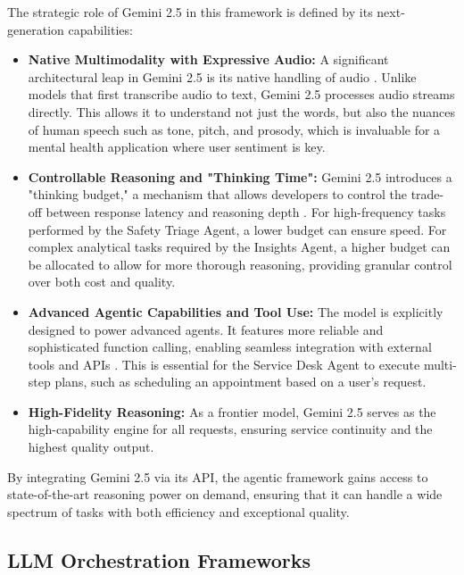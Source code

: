 The strategic role of Gemini 2.5 in this framework is defined by its next-generation capabilities:
\begin{itemize}
    \item \textbf{Native Multimodality with Expressive Audio:} A significant architectural leap in Gemini 2.5 is its native handling of audio \cite{googleblogaudio2025}. Unlike models that first transcribe audio to text, Gemini 2.5 processes audio streams directly. This allows it to understand not just the words, but also the nuances of human speech such as tone, pitch, and prosody, which is invaluable for a mental health application where user sentiment is key.
    \item \textbf{Controllable Reasoning and "Thinking Time":} Gemini 2.5 introduces a "thinking budget," a mechanism that allows developers to control the trade-off between response latency and reasoning depth \cite{google2025gemini2_5}. For high-frequency tasks performed by the Safety Triage Agent, a lower budget can ensure speed. For complex analytical tasks required by the Insights Agent, a higher budget can be allocated to allow for more thorough reasoning, providing granular control over both cost and quality.
    \item \textbf{Advanced Agentic Capabilities and Tool Use:} The model is explicitly designed to power advanced agents. It features more reliable and sophisticated function calling, enabling seamless integration with external tools and APIs \cite{google2025gemini2_5}. This is essential for the Service Desk Agent to execute multi-step plans, such as scheduling an appointment based on a user's request.
    \item \textbf{High-Fidelity Reasoning:} As a frontier model, Gemini 2.5 serves as the high-capability engine for all requests, ensuring service continuity and the highest quality output.
\end{itemize}

By integrating Gemini 2.5 via its API, the agentic framework gains access to state-of-the-art reasoning power on demand, ensuring that it can handle a wide spectrum of tasks with both efficiency and exceptional quality.


\subsection{LLM Orchestration Frameworks}
\label{subsec:llm_orchestration}

